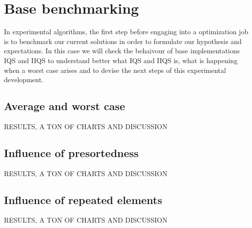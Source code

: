 \section{Base benchmarking}
In experimental algorithms, the first step before engaging into a optimization job is to benchmark our current solutions in order to formulate our hypothesis and expectations. In this case we will check the behaivour of base implementations IQS and IIQS to understand better what IQS and IIQS is, what is happening when a worst case arises and to devise the next steps of this experimental development.

\subsection{Average and worst case}
RESULTS, A TON OF CHARTS AND DISCUSSION
\subsection{Influence of presortedness}
RESULTS, A TON OF CHARTS AND DISCUSSION
\subsection{Influence of repeated elements}
RESULTS, A TON OF CHARTS AND DISCUSSION




